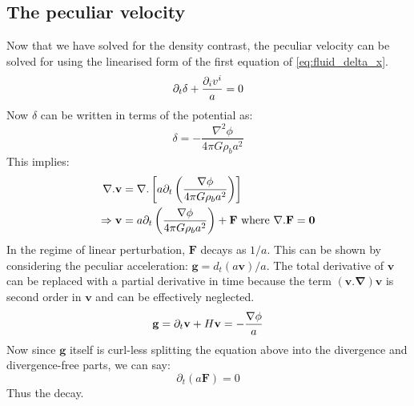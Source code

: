 \documentclass[12pt,a4paper,oneside]{book}
\def\pa{{\partial}}
\begin{document}
		\subsection{The peculiar velocity}
			Now that we have solved for the density contrast, the peculiar velocity can be solved for using the linearised form of the first equation of \ref{eq:fluid_delta_x}.
			$$
				\pa_t\delta+\frac{\pa_iv^i}{a}=0\\
			$$
			Now $\delta$ can be written in terms of the potential as:
			$$
				\delta=-\frac{\nabla^2\phi}{4\pi G\rho_ba^2}
			$$
			This implies:
			$$
			\begin{aligned}
				\nabla.\mathbf{v}&=\nabla.\left[a\pa_t\left(\frac{\nabla\phi}{4\pi G\rho_ba^2}\right)\right]\\
				\Rightarrow\mathbf{v}&=a\pa_t\left(\frac{\nabla\phi}{4\pi G\rho_ba^2}\right)+\mathbf{F}\text{ where $\bf{\nabla.F}=0$}\\
			\end{aligned}
			$$
			In the regime of linear perturbation, $\mathbf{F}$ decays as $1/a$. This can be shown by considering the peculiar acceleration: $\mathbf{g}=d_t(a\mathbf{v})/a$. The total derivative of $\mathbf{v}$ can be replaced with a partial derivative in time because the term $\mathbf{(v.\nabla)v}$ is second order in $\mathbf{v}$ and can be effectively neglected.
			$$
			\mathbf{g}=\pa_t\mathbf{v}+H\mathbf{v}=-\frac{\nabla\phi}{a}\\
			$$
			Now since $\mathbf{g}$ itself is curl-less splitting the equation above into the divergence and divergence-free parts, we can say:
			$$
				\pa_t(a\mathbf{F})=0
			$$
			Thus the decay. 
\end{document}
